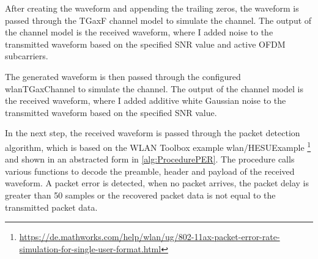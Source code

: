 After creating the waveform and appending the trailing zeros, the waveform is passed through the TGaxF channel model to simulate the channel.
The output of the channel model is the received waveform, where I added noise to the transmitted waveform based on the
specified \ac{SNR} value and active \ac{OFDM} subcarriers.

The generated waveform is then passed through the configured wlanTGaxChannel to simulate the channel.
The output of the channel model is the received waveform, where I added additive white Gaussian noise to the transmitted waveform based on the specified \ac{SNR} value.

In the next step, the received waveform is passed through the packet detection algorithm, which is based on the
WLAN Toolbox example wlan/HESUExample \footnote{\url{https://de.mathworks.com/help/wlan/ug/802-11ax-packet-error-rate-simulation-for-single-user-format.html}} and
shown in an abstracted form in \autoref{alg:ProcedurePER}.
The procedure calls various functions to decode the preamble, header and payload of
the received waveform.
A packet error is detected, when no packet arrives, the packet delay is greater than \num{50} samples or the recovered packet data
is not equal to the transmitted packet data.

